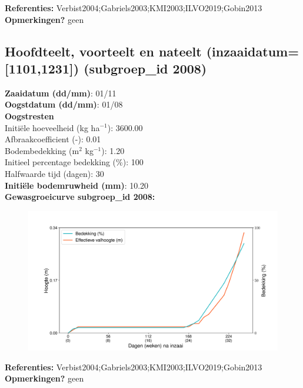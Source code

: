 \documentclass{article}
\begin{document}
  \textbf{Referenties:} Verbist2004;Gabriels2003;KMI2003;ILVO2019;Gobin2013 \vspace{0.10cm} \\ 
  \textbf{Opmerkingen?} geen \vspace{0.10cm} \\ 
 \newpage 
 \subsection{Hoofdteelt, voorteelt en nateelt (inzaaidatum=[1101,1231]) (subgroep\_id 2008)} 
  \textbf{Zaaidatum (dd/mm)}: 01/11  \vspace{0.10cm} \\ 
  \textbf{Oogstdatum (dd/mm)}: 01/08  \vspace{0.10cm} \\ 
  \textbf{Oogstresten} \vspace{0.05cm} \\ 
  \tab Initi\"{e}le hoeveelheid (kg ha$^{-1}$): 3600.00 \vspace{0.05cm} \\ 
  \tab Afbraakcoefficient (-): 0.01 \vspace{0.05cm} \\ 
  \tab Bodembedekking (m$^2$ kg$^{-1}$): 1.20 \vspace{0.05cm} \\ 
  \tab Initieel percentage bedekking (\%): 100 \vspace{0.05cm} \\ 
  \tab Halfwaarde tijd (dagen): 30 \vspace{0.05cm} \\ 
  \textbf{Initi\"{e}le bodemruwheid (mm)}: 10.20 \vspace{0.05cm} \\ 
  \textbf{Gewasgroeicurve subgroep\_id 2008:} 
 \begin{center} \begin{figure}[H] \includegraphics[width=12.5cm]{temp/2008.png} \end{figure} \end{center} 
  \textbf{Referenties:} Verbist2004;Gabriels2003;KMI2003;ILVO2019;Gobin2013 \vspace{0.10cm} \\ 
  \textbf{Opmerkingen?} geen \vspace{0.10cm} \\ 
 \newpage 
\end{document}
